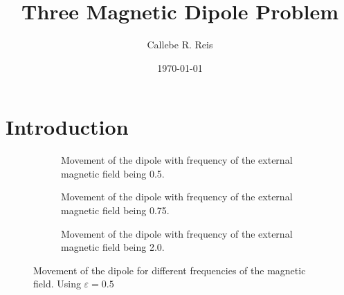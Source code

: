 \documentclass[12pt, twocolumn]{article}
\title{Three Magnetic Dipole Problem}
\author{Callebe R. Reis}
\date{\today}
\begin{document}
\maketitle

\tableofcontents

\section{Introduction}




\begin{figure*}
    \begin{subfigure}{\textwidth}
        
        \caption{Movement of the dipole with frequency of the external magnetic field being 0.5.}
        \label{fig:omega05}
    \end{subfigure}
    \begin{subfigure}{\textwidth}
        
        \caption{Movement of the dipole with frequency of the external magnetic field being 0.75.}
        \label{fig:omega075}
    \end{subfigure}
    \begin{subfigure}{\textwidth}
        
        \caption{Movement of the dipole with frequency of the external magnetic field being 2.0.}
        \label{fig:omega20}
    \end{subfigure}
    \caption{Movement of the dipole for different frequencies of the magnetic field. Using $\varepsilon = 0.5$}
\end{figure*}

\listoffigures



\end{document}
